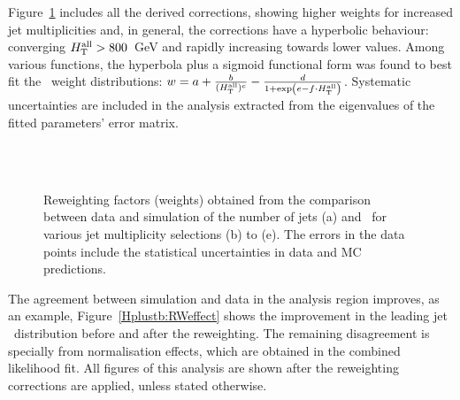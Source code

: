 Figure~\ref{Hplustb:RWfactors} includes all the derived corrections, showing higher weights for increased jet multiplicities and, in general, the \HTall corrections have a hyperbolic behaviour: converging $H_{\text{T}}^{\text{all}} > 800$~GeV and rapidly increasing towards lower values. Among various functions, the hyperbola plus a sigmoid functional form was found to best fit the \HTall\ weight distributions: $w=a+\frac{b}{(H_{\text{T}}^{\text{all}})^c} - \frac{d}{1+\exp(e-f\cdot H_{\text{T}}^{\text{all}})}$. Systematic uncertainties are included in the analysis extracted from the eigenvalues of the fitted parameters' error matrix.

\begin{figure}[htb]
    \RawFloats
    \begin{center}
     \\ 
      \\
    \caption{Reweighting factors (weights) obtained from the comparison between data and simulation of the number of jets (a) and \HTall\ for various jet multiplicity selections (b) to (e).
    The errors in the data points include the statistical uncertainties in data and MC predictions.}
    \label{Hplustb:RWfactors}
\end{center}
\end{figure}

The agreement between simulation and data in the analysis region improves, as an example, Figure~\ref{Hplustb:RWeffect} shows the improvement in the leading jet \pT\ distribution before and after the reweighting. The remaining disagreement is specially from normalisation effects, which are obtained in the combined likelihood fit. All figures of this analysis are shown after the reweighting corrections are applied, unless stated otherwise.

